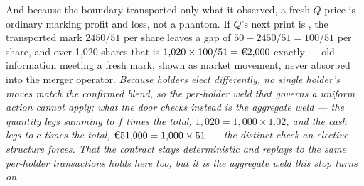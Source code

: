 And because the boundary transported only what it observed, a fresh $Q$ price is
ordinary marking profit and loss, not a phantom. If $Q$'s next print is , the
transported mark $2450/51$ per share leaves a gap of $50 - 2450/51 = 100/51$ per
share, and over 1{,}020 shares that is $1{,}020 \times 100/51 = \EUR{2{,}000}$ exactly
--- old information meeting a fresh mark, shown as market movement, never absorbed into
the merger operator. \emph{Because holders elect differently, no single holder's moves
match the confirmed blend, so the per-holder weld that governs a uniform action cannot
apply; what the door checks instead is the aggregate weld --- the quantity legs summing
to $f$ times the total, $1{,}020 = 1{,}000 \times 1.02$, and the cash legs to $c$ times
the total, $\EUR{51{,}000} = 1{,}000 \times 51$ --- the distinct check an elective
structure forces. That the contract stays deterministic and replays to the same
per-holder transactions holds here too, but it is the aggregate weld this stop turns
on.}
